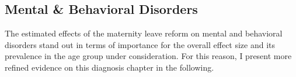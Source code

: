 \documentclass[11pt, a4paper,draft]{article} %
\begin{document}
\subsection{Mental \& Behavioral Disorders}
The estimated effects of the maternity leave reform on mental and behavioral disorders stand out in terms of importance for the overall effect size and its prevalence in the age group under consideration. For this reason, I present more refined evidence on this diagnosis chapter in the following. %
\end{document}
